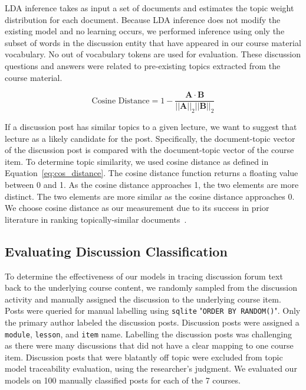 \documentclass[sigconf, nonacm=true]{acmart}
\begin{document}
LDA inference takes as input a set of documents and estimates the topic weight distribution for each document.
Because LDA inference does not modify the existing model and no learning occurs, we performed inference using only the subset of words in the discussion entity that have appeared in our course material vocabulary.
No out of vocabulary tokens are used for evaluation.
These discussion questions and answers were related to pre-existing topics extracted from the course material.

\begin{equation}
    \text{Cosine Distance} = 1 - \frac {\pmb A \cdot \pmb B}{||\pmb A||_2 ||\pmb B||_2}
    \label{eq:cos_distance}
\end{equation}

If a discussion post has similar topics to a given lecture, we want to suggest that lecture as a likely candidate for the post.
Specifically, the document-topic vector of the discussion post is compared with the document-topic vector of the course item.
To determine topic similarity, we used cosine distance as defined in Equation~\ref{eq:cos_distance}.
The cosine distance function returns a floating value between 0 and 1.
As the cosine distance approaches 1, the two elements are more distinct.
The two elements are more similar as the cosine distance approaches 0.
We choose cosine distance as our measurement due to its success in prior literature in ranking topically-similar documents~\cite{6062077}.


\subsection{Evaluating Discussion Classification}


To determine the effectiveness of our models in tracing discussion forum text back to the underlying course content, we randomly sampled from the discussion activity and manually assigned the discussion to the underlying course item.
Posts were queried for manual labelling using \texttt{sqlite} "\texttt{ORDER BY RANDOM()}".
Only the primary author labeled the discussion posts.
Discussion posts were assigned a \texttt{module}, \texttt{lesson}, and \texttt{item} name.
Labelling the discussion posts was challenging as there were many discussions that did not have a clear mapping to one course item.
Discussion posts that were blatantly off topic were excluded from topic model traceability evaluation, using the researcher's judgment.
We evaluated our models on 100 manually classified posts for each of the 7 courses.
\end{document}
